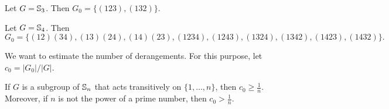 \begin{example}
Let $G=\mathbb{S}_3$. Then $G_0=\{(123),(132)\}$.
\end{example}

\begin{example}
Let $G=\mathbb{S}_4$. Then 
    \[
    G_0=\{(12)(34),(13)(24),(14)(23),(1234),(1243),(1324),(1342),(1423),(1432)\}.
    \]
\end{example}

We want to estimate the number of derangements. For this purpose, let $c_0 = |G_0| / |G|$.



\begin{theorem}
    \label{thm:CameronCohen}
    If $G$ is a subgroup of $\mathbb{S}_n$ that acts transitively on 
    $\{1,\dots,n\}$, then $c_0\geq\frac{1}{n}$. Moreover, 
    if $n$ is not the power of a prime number, then
    $c_0>\frac{1}{n}$. 
\end{theorem}

